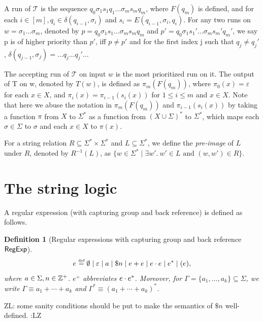 \documentclass[sigplan,review,anonymous]{acmart}\settopmatter{printfolios=true,printccs=false,printacmref=false}
\newcommand{\zhilin}[1]{\color{brown} {ZL: #1 :LZ} \color{black}}
\newcommand{\zhilin}[1]{}
\newcommand{\tmop}[1]{\ensuremath{\operatorname{#1}}}
\newtheorem{definition}{Definition}
\newcommand\NSST{{\sf NSST}}
\newcommand\psst{\mathcal{T}}
\begin{document}
  A run of $\psst$ is the sequence $q_0 \sigma_1 s_1 q_1 \ldots \sigma_m s_m q_m$,
  where $F (q_m)$ is defined, and for each $i \in [m], q_i \in \delta (q_{i-1}, \sigma_i)$ and $s_i = E (q_{i - 1}, \sigma_i, q_i)$. For any two runs on $w = \sigma_1 \ldots \sigma_m$, denoted by $p = q_0 \sigma_1 s_1 \ldots \sigma_m s_m q_m$ and $p' = q_0 \sigma_1
  s_1' \ldots \sigma_m s_m' q_m'$, we say p is of higher priority than
  $p'$, iff $p \neq p'$ and for the first index j such that $q_j \neq q_j'$,
  $\delta (q_{j - 1}, \sigma_j) = \ldots q_j \ldots q_j' \ldots$
  
  The accepting run of $\psst$ on input $w$ is the most prioritized run on it. The output of T on w, denoted by $T(w)$, is defined as $\pi_m(F(q_m))$, where $\pi_0(x) = \varepsilon$ for each $x \in X$, and $\pi_{i}(x) = \pi_{i-1}(s_{i}(x))$ for $1 \le i \le m$ and $x \in X$. Note that here we abuse the notation in $\pi_m(F(q_m))$ and $\pi_{i-1}(s_{i}(x))$ by taking a function $\pi$ from $X$ to $\Sigma^*$ as a function from $(X \cup \Sigma)^*$ to $\Sigma^*$, which maps each $\sigma \in \Sigma$ to $\sigma$ and each $x \in X$ to $\pi(x)$.  
  
  

For a string relation $R \subseteq \Sigma^* \times \Sigma^*$ and $L \subseteq \Sigma^*$, we define the \emph{pre-image} of $L$ under $R$, denoted by $R^{-1}(L)$, as $\{w \in \Sigma^* \mid \exists w'.\ w' \in L \mbox{ and } (w, w') \in R\}$. 
 


\section{The string logic}


A regular expression (with capturing group and back reference) is defined as follows.

\begin{definition}[Regular expressions with capturing group and back reference ${\sf RegExp}$]
	\[e \eqdef \emptyset \mid \varepsilon \mid a \mid \$n \mid e + e \mid e \concat e \mid e^* \mid (e)  , \]
where $a \in \Sigma, n \in \mathbb{Z}^+$. 
$e^+$ abbreviates $e \cdot e^*$. Moreover, for $\Gamma = \{a_1, \ldots, a_k\}\subseteq \Sigma$, we write $\Gamma \equiv a_1 + \cdots + a_k$ and $\Gamma^\ast \equiv (a_1 + \cdots + a_k)^\ast$. 
\end{definition}
\zhilin{some sanity conditions should be put to make the semantics of $\$ n$ well-defined.}
\end{document}
